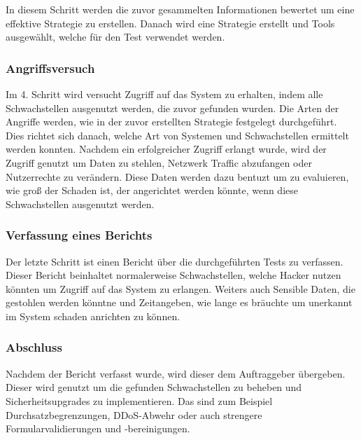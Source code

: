 In diesem Schritt werden die zuvor gesammelten Informationen bewertet um eine effektive Strategie zu erstellen. Danach wird eine Strategie erstellt und Tools ausgewählt, welche für den Test verwendet werden. 

\subsubsection{Angriffsversuch}

Im 4. Schritt wird versucht Zugriff auf das System zu erhalten, indem alle Schwachstellen ausgenutzt werden, die zuvor gefunden wurden. Die Arten der Angriffe werden, wie in der zuvor erstellten Strategie festgelegt durchgeführt. Dies richtet sich danach, welche Art von Systemen und Schwachstellen ermittelt werden konnten. Nachdem ein erfolgreicher Zugriff erlangt wurde, wird der Zugriff genutzt um Daten zu stehlen, Netzwerk Traffic abzufangen oder Nutzerrechte zu verändern. Diese Daten werden dazu bentuzt um zu evaluieren, wie groß der Schaden ist, der angerichtet werden könnte, wenn diese Schwachstellen ausgenutzt werden.

\subsubsection{Verfassung eines Berichts}

Der letzte Schritt ist einen Bericht über die durchgeführten Tests zu verfassen. Dieser Bericht beinhaltet normalerweise Schwachstellen, welche Hacker nutzen könnten um Zugriff auf das System zu erlangen. Weiters auch Sensible Daten, die gestohlen werden könntne und Zeitangeben, wie lange es bräuchte um unerkannt im System schaden anrichten zu können.

\subsubsection{Abschluss}

Nachdem der Bericht verfasst wurde, wird dieser dem Auftraggeber übergeben. Dieser wird genutzt um  die gefunden Schwachstellen zu beheben und Sicherheitsupgrades zu implementieren. Das sind zum Beispiel Durchsatzbegrenzungen, DDoS-Abwehr oder auch strengere Formularvalidierungen und -bereinigungen.
